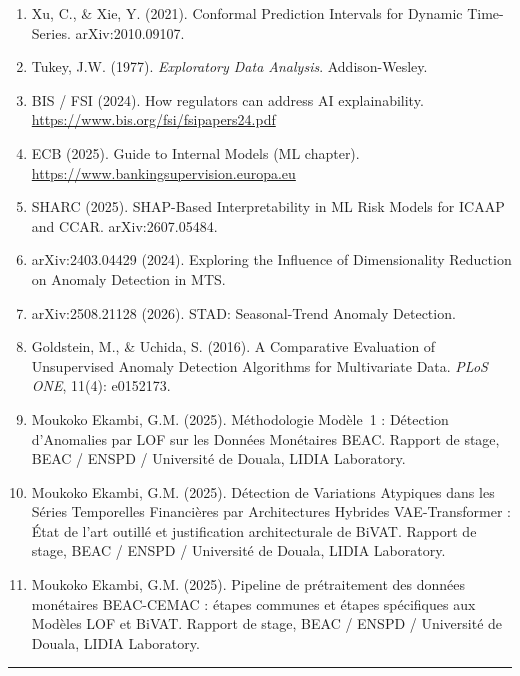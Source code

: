 \documentclass[12pt,a4paper]{article}
\begin{document}
\begin{enumerate}
\item Xu, C., \& Xie, Y. (2021). Conformal Prediction Intervals for Dynamic
Time-Series. arXiv:2010.09107.

\item Tukey, J.W. (1977). \textit{Exploratory Data Analysis}.
Addison-Wesley.

\item BIS / FSI (2024). How regulators can address AI explainability.
\url{https://www.bis.org/fsi/fsipapers24.pdf}

\item ECB (2025). Guide to Internal Models (ML chapter).
\url{https://www.bankingsupervision.europa.eu}

\item SHARC (2025). SHAP-Based Interpretability in ML Risk Models for
ICAAP and CCAR. arXiv:2607.05484.

\item arXiv:2403.04429 (2024). Exploring the Influence of Dimensionality
Reduction on Anomaly Detection in MTS.

\item arXiv:2508.21128 (2026). STAD: Seasonal-Trend Anomaly Detection.

\item Goldstein, M., \& Uchida, S. (2016). A Comparative Evaluation of
Unsupervised Anomaly Detection Algorithms for Multivariate Data.
\textit{PLoS ONE}, 11(4): e0152173.

\item Moukoko Ekambi, G.M. (2025). Méthodologie Modèle~1 : Détection
d'Anomalies par LOF sur les Données Monétaires BEAC. Rapport de stage,
BEAC / ENSPD / Université de Douala, LIDIA Laboratory.

\item Moukoko Ekambi, G.M. (2025). Détection de Variations Atypiques dans
les Séries Temporelles Financières par Architectures Hybrides VAE-Transformer :
État de l'art outillé et justification architecturale de BiVAT. Rapport de
stage, BEAC / ENSPD / Université de Douala, LIDIA Laboratory.

\item Moukoko Ekambi, G.M. (2025). Pipeline de prétraitement des données
monétaires BEAC-CEMAC : étapes communes et étapes spécifiques aux Modèles
LOF et BiVAT. Rapport de stage, BEAC / ENSPD / Université de Douala,
LIDIA Laboratory.

\end{enumerate}

\vspace{2cm}
\hrule
\vspace{0.5cm}
\end{document}
